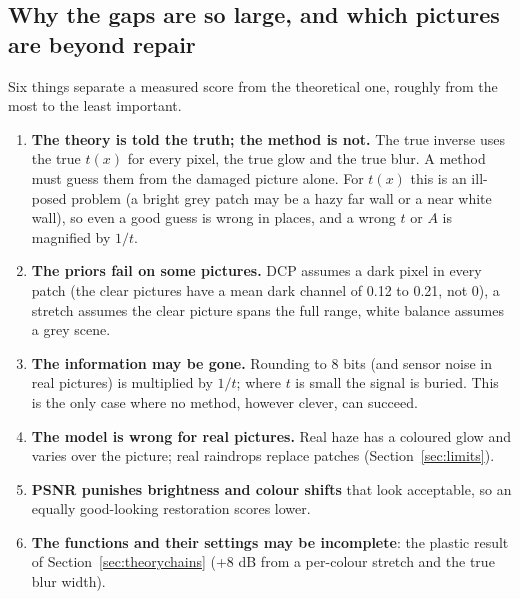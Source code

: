 \documentclass[10pt,a4paper]{article}
\begin{document}
\subsection{Why the gaps are so large, and which pictures are beyond repair}
\label{sec:beyond}
Six things separate a measured score from the theoretical one, roughly from the most to the least important.
\begin{enumerate}
\item \textbf{The theory is told the truth; the method is not.} The true inverse uses the true $t(x)$ for every pixel, the true glow and the true blur. A method must guess them from the damaged picture alone. For $t(x)$ this is an ill-posed problem (a bright grey patch may be a hazy far wall or a near white wall), so even a good guess is wrong in places, and a wrong $t$ or $A$ is magnified by $1/t$.
\item \textbf{The priors fail on some pictures.} DCP assumes a dark pixel in every patch (the clear pictures have a mean dark channel of 0.12 to 0.21, not 0), a stretch assumes the clear picture spans the full range, white balance assumes a grey scene.
\item \textbf{The information may be gone.} Rounding to 8 bits (and sensor noise in real pictures) is multiplied by $1/t$; where $t$ is small the signal is buried. This is the only case where no method, however clever, can succeed.
\item \textbf{The model is wrong for real pictures.} Real haze has a coloured glow and varies over the picture; real raindrops replace patches (Section~\ref{sec:limits}).
\item \textbf{PSNR punishes brightness and colour shifts} that look acceptable, so an equally good-looking restoration scores lower.
\item \textbf{The functions and their settings may be incomplete}: the plastic result of Section~\ref{sec:theorychains} (+8 dB from a per-colour stretch and the true blur width).
\end{enumerate}
\end{document}
